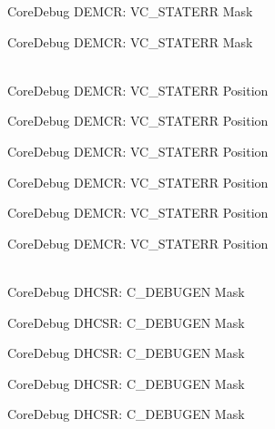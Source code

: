 \begin{DoxyRefList}
\label{deprecated__deprecated000513}%
%
Core\+Debug DEMCR:\+ VC\+\_\+\+STATERR Mask 

\label{deprecated__deprecated000615}%
%
Core\+Debug DEMCR:\+ VC\+\_\+\+STATERR Mask  
\item[{\parbox[t]{\linewidth}{Global \doxylink{group__CMSIS__CoreDebug_ga16f0d3d2ce1e1e8cd762d938ac56c4ac}{Core\+Debug\+\_\+\+DEMCR\+\_\+\+VC\+\_\+\+STATERR\+\_\+\+Pos} }}]\hfill \\
\label{deprecated__deprecated000061}%
%
Core\+Debug DEMCR:\+ VC\+\_\+\+STATERR Position 

\label{deprecated__deprecated000205}%
%
Core\+Debug DEMCR:\+ VC\+\_\+\+STATERR Position 

\label{deprecated__deprecated000347}%
%
Core\+Debug DEMCR:\+ VC\+\_\+\+STATERR Position 

\label{deprecated__deprecated000423}%
%
Core\+Debug DEMCR:\+ VC\+\_\+\+STATERR Position 

\label{deprecated__deprecated000512}%
%
Core\+Debug DEMCR:\+ VC\+\_\+\+STATERR Position 

\label{deprecated__deprecated000614}%
%
Core\+Debug DEMCR:\+ VC\+\_\+\+STATERR Position  
\item[{\parbox[t]{\linewidth}{Global \doxylink{group__CMSIS__CoreDebug_gab815c741a4fc2a61988cd2fb7594210b}{Core\+Debug\+\_\+\+DHCSR\+\_\+\+C\+\_\+\+DEBUGEN\+\_\+\+Msk} }}]\hfill \\
\label{deprecated__deprecated000040}%
%
Core\+Debug DHCSR:\+ C\+\_\+\+DEBUGEN Mask 

\label{deprecated__deprecated000128}%
%
Core\+Debug DHCSR:\+ C\+\_\+\+DEBUGEN Mask 

\label{deprecated__deprecated000184}%
%
Core\+Debug DHCSR:\+ C\+\_\+\+DEBUGEN Mask 

\label{deprecated__deprecated000267}%
%
Core\+Debug DHCSR:\+ C\+\_\+\+DEBUGEN Mask 

\label{deprecated__deprecated000326}%
%
Core\+Debug DHCSR:\+ C\+\_\+\+DEBUGEN Mask 


\end{DoxyRefList}

